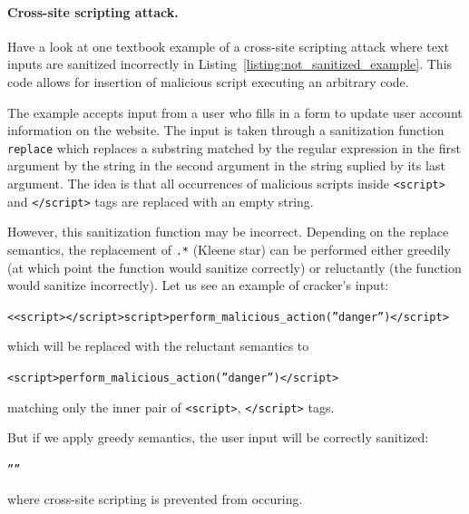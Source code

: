 \paragraph{Cross-site scripting attack.}
Have a look at one textbook example of a cross-site scripting attack where text inputs are sanitized incorrectly in Listing~\ref{listing:not_sanitized_example}.
This code allows for insertion of malicious script executing an arbitrary code.

The example accepts input from a user who fills in a form to update user account information on the website.
The input is taken through a sanitization function \texttt{replace} which replaces a substring matched by the regular expression in the first argument by the string in the second argument in the string suplied by its last argument.
The idea is that all occurrences of malicious scripts inside \texttt{<script>} and \texttt{</script>} tags are replaced with an empty string.

However, this sanitization function may be incorrect.
Depending on the replace semantics, the replacement of \texttt{.*} (Kleene star) can be performed either greedily (at which point the function would sanitize correctly) or reluctantly (the function would sanitize incorrectly).
Let us see an example of cracker's input:
\begin{center}
 \texttt{<<script></script>script>perform\_malicious\_action(''danger'')</script>}
\end{center}
which will be replaced with the reluctant semantics to
\begin{center}
 \texttt{<script>perform\_malicious\_action(''danger'')</script>}
\end{center}

matching only the inner pair of \texttt{<script>}, \texttt{</script>} tags.

But if we apply greedy semantics, the user input will be correctly sanitized:
\begin{center}
 \texttt{''''}
\end{center}
where cross-site scripting is prevented from occuring.

